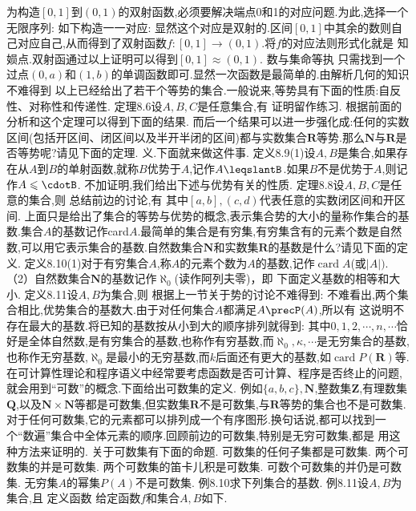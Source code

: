 为构造$[0,1]$到$(0,1)$的双射函数,必须要解决端点0和1的对应问题.为此,选择一个无限序列:
如下构造一一对应:
显然这个对应是双射的.区间$[0,1]$中其余的数则自己对应自己,从而得到了双射函数$f:[0,1]\rightarrow$$(0,1)$.将$f$的对应法则形式化就是
知㛣点.双射函通过以上证明可以得到$[0,1]\approx(0,1)$.
数与集命等执
只需找到一个过点$(0,a)$和$(1,b)$的单调函数即可.显然一次函数是最简单的.由解析几何的知识不难得到
以上已经给出了若干个等势的集合.一般说来,等势具有下面的性质:自反性、对称性和传递性.
定理$8.6$设$A,B,C$是任意集合,有
证明留作练习.
根据前面的分析和这个定理可以得到下面的结果.
而后一个结果可以进一步强化成:任何的实数区间(包括开区间、闭区间以及半开半闭的区间)都与实数集合$\mathbf{R}$等势.那么$\mathbf{N}$与$\mathbf{R}$是否等势呢?请见下面的定理.
义.下面就来做这件事.
定义8.9(1)设$A,B$是集合,如果存在从$A$到$B$的单射函数,就称$B$优势于$A$,记作$A\leqslantB$.如果$B$不是优势于$A$,则记作$A\leqslant\cdotB$.
不加证明,我们给出下述与优势有关的性质.
定理$8.8$设$A,B,C$是任意的集合,则
总结前边的讨论,有
其中$[a,b],(c,d)$代表任意的实数闭区间和开区间.
上面只是给出了集合的等势与优势的概念,表示集合势的大小的量称作集合的基数.集合$A$的基数记作card$A$.最简单的集合是有穷集,有穷集含有的元素个数是自然数,可以用它表示集合的基数.自然数集合$\mathbf{N}$和实数集$\mathbf{R}$的基数是什么?请见下面的定义.
定义8.10(1)对于有穷集合$A$,称$A$的元素个数为$A$的基数,记作$\operatorname{card}A$(或$|A|)$.
（2）自然数集合$\mathbf{N}$的基数记作$\aleph_{0}$(读作阿列夫零)，即
下面定义基数的相等和大小.
定义8.11设$A,B$为集合,则
根据上一节关于势的讨论不难得到:
不难看出,两个集合相比,优势集合的基数大.由于对任何集合$A$都满足$A\precP(A)$,所以有
这说明不存在最大的基数.将已知的基数按从小到大的顺序排列就得到:
其中$0,1,2,\cdots,n,\cdots$恰好是全体自然数,是有穷集合的基数,也称作有穷基数,而$\aleph_{0},\kappa,\cdots$是无穷集合的基数,也称作无穷基数,$\aleph_{0}$是最小的无穷基数,而$k$后面还有更大的基数,如$\operatorname{card}P(\mathbf{R})$等.
在可计算性理论和程序语义中经常要考虑函数是否可计算、程序是否终止的问题,就会用到“可数”的概念.下面给出可数集的定义.
例如$\{a,b,c\},\mathbf{N}$,整数集$\mathbf{Z}$,有理数集$\mathbf{Q}$,以及$\mathbf{N}\times\mathbf{N}$等都是可数集,但实数集$\mathbf{R}$不是可数集,与$\mathbf{R}$等势的集合也不是可数集.对于任何可数集,它的元素都可以排列成一个有序图形.换句话说,都可以找到一个“数遍”集合中全体元素的顺序.回顾前边的可数集,特别是无穷可数集,都是
用这种方法来证明的.
关于可数集有下面的命题.
可数集的任何子集都是可数集.
两个可数集的并是可数集.
两个可数集的笛卡儿积是可数集.
可数个可数集的并仍是可数集.
无穷集$A$的幂集$P(A)$不是可数集.
例8.10求下列集合的基数.
例8.11设$A,B$为集合,且
定义函数
给定函数$f$和集合$A,B$如下.\\
$$

